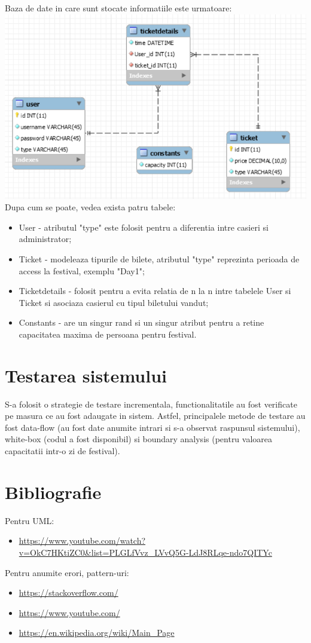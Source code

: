 \documentclass[11pt,a4paper,twoside,notitlepage]{article}
\begin{document}
Baza de date in care sunt stocate informatiile este urmatoare: \\
\includegraphics[height=.3\textheight, width=.8\textwidth]{Database} \\
Dupa cum se poate, vedea exista patru tabele:
\begin{itemize}
	\item User - atributul "type" este folosit pentru a diferentia intre casieri si administrator;
	\item Ticket - modeleaza tipurile de bilete, atributul "type" reprezinta perioada de access la festival, exemplu "Day1";
	\item Ticketdetails - folosit pentru a evita relatia de n la n intre tabelele User si Ticket si asociaza casierul cu tipul biletului vandut;
	\item Constants - are un singur rand si un singur atribut pentru a retine capacitatea maxima de persoana pentru festival.
\end{itemize}


\section{Testarea sistemului}

S-a folosit o strategie de testare incrementala, functionalitatile au fost verificate pe masura ce au fost adaugate in sistem. Astfel, principalele metode de testare au fost data-flow (au fost date anumite intrari si s-a observat raspunsul sistemului), white-box (codul a fost disponibil) si boundary analysis (pentru valoarea capacitatii intr-o zi de festival).

\section{Bibliografie}

Pentru UML:
\begin{itemize}
	\item \url{https://www.youtube.com/watch?v=OkC7HKtiZC0&list=PLGLfVvz_LVvQ5G-LdJ8RLqe-ndo7QITYc}  \\
\end{itemize}
Pentru anumite erori, pattern-uri:
\begin{itemize}
	\item \url{https://stackoverflow.com/}
	\item \url{https://www.youtube.com/}	
	\item \url{https://en.wikipedia.org/wiki/Main_Page}
\end{itemize}
\end{document}
